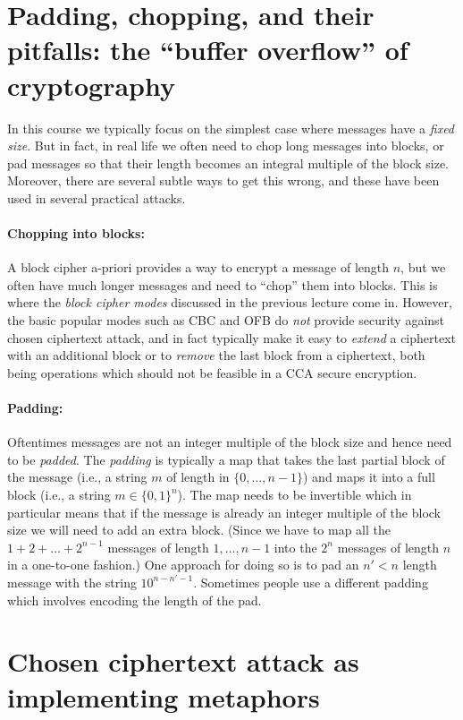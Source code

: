 \section{Padding, chopping, and their pitfalls: the ``buffer overflow''
of cryptography}\label{Padding-chopping-and-their-pit}

In this course we typically focus on the simplest case where messages
have a \emph{fixed size}. But in fact, in real life we often need to
chop long messages into blocks, or pad messages so that their length
becomes an integral multiple of the block size. Moreover, there are
several subtle ways to get this wrong, and these have been used in
several practical attacks.

\paragraph{Chopping into blocks:} A block cipher a-priori provides a way
to encrypt a message of length \(n\), but we often have much longer
messages and need to ``chop'' them into blocks. This is where the
\emph{block cipher modes} discussed in the previous lecture come in.
However, the basic popular modes such as CBC and OFB do \emph{not}
provide security against chosen ciphertext attack, and in fact typically
make it easy to \emph{extend} a ciphertext with an additional block or
to \emph{remove} the last block from a ciphertext, both being operations
which should not be feasible in a CCA secure encryption.

\paragraph{Padding:} Oftentimes messages are not an integer multiple of
the block size and hence need to be \emph{padded}. The \emph{padding} is
typically a map that takes the last partial block of the message (i.e.,
a string \(m\) of length in \(\{0,\ldots,n-1\}\)) and maps it into a
full block (i.e., a string \(m\in\{0,1\}^n\)). The map needs to be
invertible which in particular means that if the message is already an
integer multiple of the block size we will need to add an extra block.
(Since we have to map all the \(1+2+\ldots+2^{n-1}\) messages of length
\(1,\ldots,n-1\) into the \(2^n\) messages of length \(n\) in a
one-to-one fashion.) One approach for doing so is to pad an \(n'<n\)
length message with the string \(10^{n-n'-1}\). Sometimes people use a
different padding which involves encoding the length of the pad.

\section{Chosen ciphertext attack as implementing
metaphors}\label{Chosen-ciphertext-attack-as-im}

